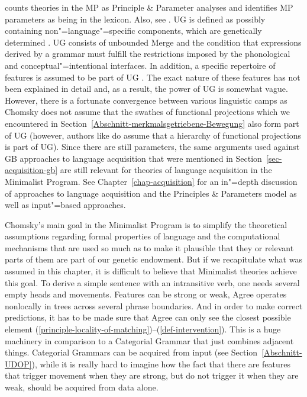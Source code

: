 \citet[]{Chomsky2008a} counts theories in the MP as Principle \& Parameter analyses and
identifies MP parameters as being in the lexicon. Also, see . UG is
defined as possibly containing non"=language"=specific components, which are genetically determined
\citep[]{Chomsky2007a}. UG consists of unbounded Merge and the condition that expressions
derived by a grammar must fulfill the restrictions imposed by the phonological and
conceptual"=intentional interfaces. In addition, a specific repertoire of features is assumed to be
part of UG \citep[--7]{Chomsky2007a}.  The exact nature of these features has not been
explained in detail and, as a result, the power of UG is somewhat vague. However, there is a
fortunate convergence between various linguistic camps as Chomsky does not assume that the swathes
of functional projections which we encountered in
Section~\ref{Abschnitt-merkmalsgetriebene-Bewegung} also form part of UG (however, authors like
\citet{CR2010a} do assume that a hierarchy of functional projections is part of UG). Since there are still
parameters, the same arguments used against GB approaches to language acquisition that were
mentioned in Section~\ref{sec-acquisition-gb} are still relevant for theories of language
acquisition in the Minimalist Program. See Chapter~\ref{chap-acquisition} for an in"=depth
discussion of approaches to language acquisition and the 
Principles \& Parameters 
model as well as input"=based approaches.

Chomsky's main goal in the Minimalist Program is to simplify the theoretical assumptions regarding
formal properties of language and the computational mechanisms that are used so much as to make it
plausible that they or relevant parts of them are part of our genetic endowment. But if we
recapitulate what was assumed in this chapter, it is difficult to believe that Minimalist theories
achieve this goal. To derive a simple sentence with an intransitive verb, one needs several empty
heads and movements. Features can be strong or weak, Agree operates nonlocally in trees across
several phrase boundaries. And in order to make correct predictions, it has to be made sure that
Agree can only see the closest possible element
(\ref{principle-locality-of-matching})--(\ref{def-intervention}). 
This is a huge machinery
in comparison to a Categorial Grammar that just combines adjacent things. Categorial Grammars can be
acquired from input (see Section~\ref{Abschnitt-UDOP}), while it is really hard to imagine how the
fact that there are features that trigger movement when they are strong, but do not trigger it when
they are weak, should be acquired from data alone.


